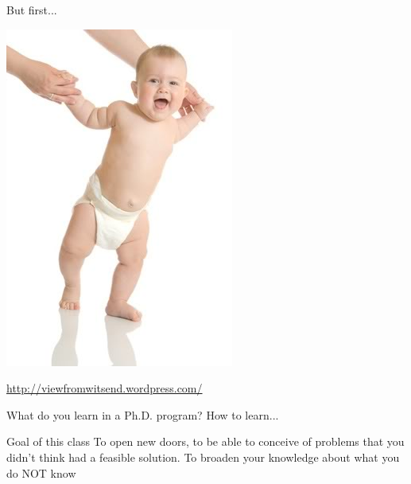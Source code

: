 \documentclass[xcolor=table,compress]{beamer}
\begin{document}
\begin{frame}{But first...}
\pause
\begin{center}
\includegraphics[height=0.8\textheight]{./baby-steps-one}
\end{center}
\tiny \href{http://viewfromwitsend.wordpress.com/}{http://viewfromwitsend.wordpress.com/}
\end{frame}


\begin{frame}
\begin{block}{What do you learn in a Ph.D. program?}
\pause
 How to learn...
\end{block}
\end{frame}

\begin{frame}
\begin{block}{Goal of this class}
\pause
To open new doors, to be able to conceive of problems that you didn't think had a feasible solution.\newline
\pause
To broaden your knowledge about what you do NOT know
\end{block}
\end{frame}
\end{document}
